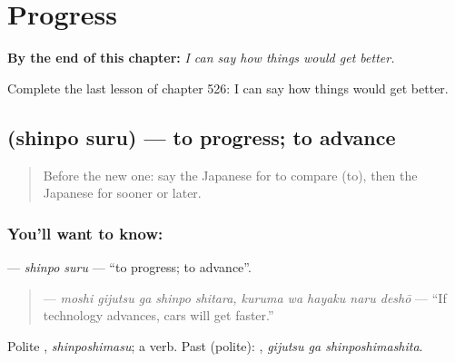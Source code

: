 
\chapter{Progress}
\label{ch:ja-progress}

\begin{chapteropening}
\textbf{By the end of this chapter:} \emph{I can say how things would get better.}

Complete the last lesson of chapter 526: I can say how things would get better.
\end{chapteropening}

\section[\texorpdfstring{\ja{しんぽする} (shinpo suru)}{しんぽする (shinpo suru)}]{ (shinpo suru) — to progress; to advance}

\label{lesson:JA-C526-shinpo-suru}



\begin{quote}
Before the new one: say the Japanese for to compare (to), then the Japanese for sooner or later.
\end{quote}

\subsection*{You'll want to know: }
\textbf{} — \emph{shinpo suru} — \textquotedblleft{}to progress; to advance\textquotedblright{}.

\begin{quote}
\textbf{    } — \emph{moshi gijutsu ga shinpo shitara, kuruma wa hayaku naru deshō} — \textquotedblleft{}If technology advances, cars will get faster.\textquotedblright{}
\end{quote}

Polite \textbf{}, \emph{shinposhimasu}; a  verb. Past (polite): \textbf{ }, \emph{gijutsu ga shinposhimashita}.

